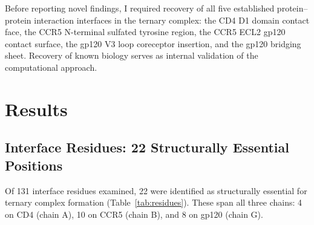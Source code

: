 \documentclass[11pt,a4paper]{article}
\begin{document}
Before reporting novel findings, I required recovery of all five established protein--protein interaction interfaces in the ternary complex: the CD4 D1 domain contact face, the CCR5 N-terminal sulfated tyrosine region, the CCR5 ECL2 gp120 contact surface, the gp120 V3 loop coreceptor insertion, and the gp120 bridging sheet. Recovery of known biology serves as internal validation of the computational approach.

\section{Results}

\subsection{Interface Residues: 22 Structurally Essential Positions}

Of 131 interface residues examined, 22 were identified as structurally essential for ternary complex formation (Table~\ref{tab:residues}). These span all three chains: 4 on CD4 (chain A), 10 on CCR5 (chain B), and 8 on gp120 (chain G).
\end{document}
